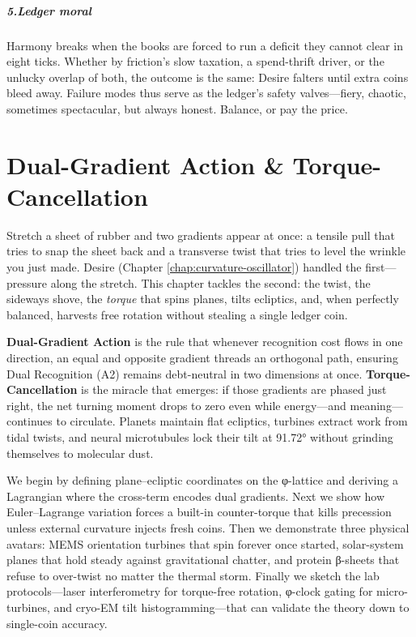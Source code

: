 \documentclass[11pt,oneside]{book}
\begin{document}
\paragraph*{5.\;Ledger moral}

Harmony breaks when the books are forced to run a deficit they cannot
clear in eight ticks.  
Whether by friction’s slow taxation, a spend-thrift driver, or the
unlucky overlap of both, the outcome is the same: Desire falters until
extra coins bleed away.  
Failure modes thus serve as the ledger’s safety valves—fiery, chaotic,
sometimes spectacular, but always honest.  Balance, or pay the price.

\chapter{Dual-Gradient Action \& Torque-Cancellation}
\label{chap:dual-gradient}

Stretch a sheet of rubber and two gradients appear at once:  
a tensile pull that tries to snap the sheet back and a transverse twist that tries to level the wrinkle you just made.  
Desire (Chapter \ref{chap:curvature-oscillator}) handled the first—pressure along the stretch.  
This chapter tackles the second: the twist, the sideways shove, the \emph{torque} that spins planes, tilts ecliptics, and, when perfectly balanced, harvests free rotation without stealing a single ledger coin.

\textbf{Dual-Gradient Action} is the rule that whenever recognition cost flows in one direction, an equal and opposite gradient threads an orthogonal path, ensuring Dual Recognition (A2) remains debt-neutral in two dimensions at once.  
\textbf{Torque-Cancellation} is the miracle that emerges: if those gradients are phased just right, the net turning moment drops to zero even while energy—and meaning—continues to circulate.  
Planets maintain flat ecliptics, turbines extract work from tidal twists, and neural microtubules lock their tilt at 91.72° without grinding themselves to molecular dust.

We begin by defining plane–ecliptic coordinates on the φ-lattice and deriving a Lagrangian where the cross-term encodes dual gradients.  
Next we show how Euler–Lagrange variation forces a built-in counter-torque that kills precession unless external curvature injects fresh coins.  
Then we demonstrate three physical avatars: MEMS orientation turbines that spin forever once started, solar-system planes that hold steady against gravitational chatter, and protein β-sheets that refuse to over-twist no matter the thermal storm.  
Finally we sketch the lab protocols—laser interferometry for torque-free rotation, φ-clock gating for micro-turbines, and cryo-EM tilt histogramming—that can validate the theory down to single-coin accuracy.
\end{document}
